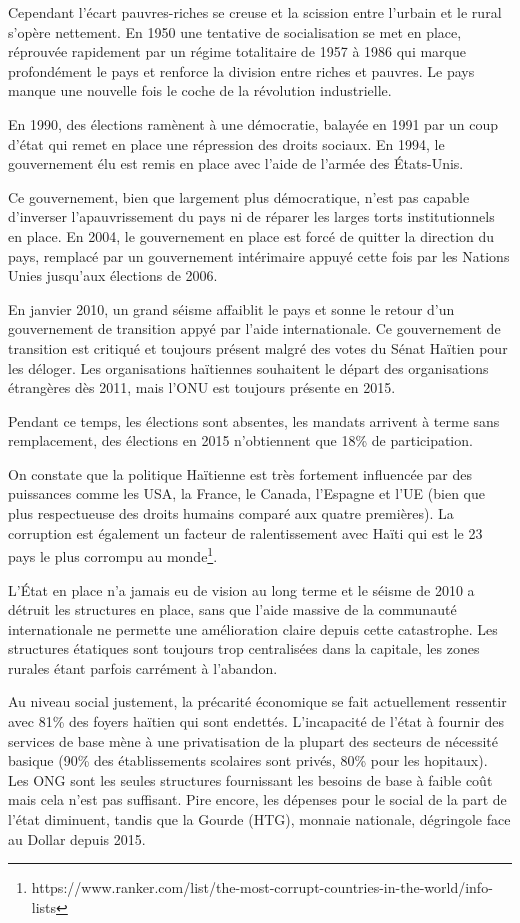 \documentclass[a4paper, 11pt]{article}
\begin{document}
  Cependant l'écart pauvres-riches se creuse et la scission entre l'urbain et le rural s'opère nettement. En 1950 une tentative de socialisation se met en place, réprouvée rapidement par un régime totalitaire de 1957 à 1986 qui marque profondément le pays et renforce la division entre riches et pauvres. Le pays manque une nouvelle fois le coche de la révolution industrielle.

  En 1990, des élections ramènent à une démocratie, balayée en 1991 par un coup d'état qui remet en place une répression des droits sociaux. En 1994, le gouvernement élu est remis en place avec l'aide de l'armée des \'Etats-Unis.

  Ce gouvernement, bien que largement plus démocratique, n'est pas capable d'inverser l'apauvrissement du pays ni de réparer les larges torts institutionnels en place. En 2004, le gouvernement en place est forcé de quitter la direction du pays, remplacé par un gouvernement intérimaire appuyé cette fois par les Nations Unies jusqu'aux élections de 2006.

  En janvier 2010, un grand séisme affaiblit le pays et sonne le retour d'un gouvernement de transition appyé par l'aide internationale. Ce gouvernement de transition est critiqué et toujours présent malgré des votes du Sénat Haïtien pour les déloger. Les organisations haïtiennes souhaitent le départ des organisations étrangères dès 2011, mais l'ONU est toujours présente en 2015.

  Pendant ce temps, les élections sont absentes, les mandats arrivent à terme sans remplacement, des élections en 2015 n'obtiennent que 18\% de participation.

  On constate que la politique Haïtienne est très fortement influencée par des puissances comme les USA, la France, le Canada, l'Espagne et l'UE (bien que plus respectueuse des droits humains comparé aux quatre premières). La corruption est également un facteur de ralentissement avec Haïti qui est le 23 pays le plus corrompu au monde\footnote{https://www.ranker.com/list/the-most-corrupt-countries-in-the-world/info-lists}.

  L'\'Etat en place n'a jamais eu de vision au long terme et le séisme de 2010 a détruit les structures en place, sans que l'aide massive de la communauté internationale ne permette une amélioration claire depuis cette catastrophe. Les structures étatiques sont toujours trop centralisées dans la capitale, les zones rurales étant parfois carrément à l'abandon.

  Au niveau social justement, la précarité économique se fait actuellement ressentir avec 81\% des foyers haïtien qui sont endettés. L'incapacité de l'état à fournir des services de base mène à une privatisation de la plupart des secteurs de nécessité basique (90\% des établissements scolaires sont privés, 80\% pour les hopitaux). Les ONG sont les seules structures fournissant les besoins de base à faible coût mais cela n'est pas suffisant. Pire encore, les dépenses pour le social de la part de l'état diminuent, tandis que la Gourde (HTG), monnaie nationale, dégringole face au Dollar depuis 2015.
\end{document}
